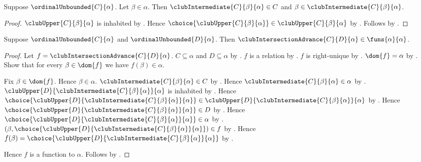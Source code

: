 \begin{proposition}\label{club_intermediate_properties}
    Suppose $\ordinalUnbounded{C}{\alpha}$.
    Let $\beta\in\alpha$.
    Then $\clubIntermediate{C}{\beta}{\alpha}\in C$ and
        $\beta\in\clubIntermediate{C}{\beta}{\alpha}$.
\end{proposition}
\begin{proof}
    $\clubUpper{C}{\beta}{\alpha}$ is inhabited
        by .
    Hence $\choice{\clubUpper{C}{\beta}{\alpha}}
        \in\clubUpper{C}{\beta}{\alpha}$ by .
    Follows by .
\end{proof}

\begin{theorem}\label{club_intersection_advance_type}
    Suppose $\ordinalUnbounded{C}{\alpha}$ and
        $\ordinalUnbounded{D}{\alpha}$.
    Then $\clubIntersectionAdvance{C}{D}{\alpha}
        \in\funs{\alpha}{\alpha}$.
\end{theorem}
\begin{proof}
    Let $f=\clubIntersectionAdvance{C}{D}{\alpha}$.
    $C\subseteq\alpha$ and $D\subseteq\alpha$
        by .
    $f$ is a relation by .
    $f$ is right-unique
        by .
    $\dom{f}=\alpha$
        by .
    Show that for every $\beta\in\dom{f}$ we have $f(\beta)\in\alpha$.
    \begin{subproof}
        Fix $\beta\in\dom{f}$.
        Hence $\beta\in\alpha$.
        $\clubIntermediate{C}{\beta}{\alpha}\in C$
            by .
        Hence $\clubIntermediate{C}{\beta}{\alpha}\in\alpha$
            by .
        $\clubUpper{D}{\clubIntermediate{C}{\beta}{\alpha}}{\alpha}$
            is inhabited by .
        Hence $\choice{\clubUpper{D}{
            \clubIntermediate{C}{\beta}{\alpha}}{\alpha}}
            \in\clubUpper{D}{
                \clubIntermediate{C}{\beta}{\alpha}}{\alpha}$
            by .
        Hence $\choice{\clubUpper{D}{
            \clubIntermediate{C}{\beta}{\alpha}}{\alpha}}\in D$
            by .
        Hence $\choice{\clubUpper{D}{
            \clubIntermediate{C}{\beta}{\alpha}}{\alpha}}\in\alpha$
            by .
        $(\beta,\choice{\clubUpper{D}{
            \clubIntermediate{C}{\beta}{\alpha}}{\alpha}})\in f$
            by .
        Hence $f(\beta)=\choice{\clubUpper{D}{
            \clubIntermediate{C}{\beta}{\alpha}}{\alpha}}$
            by .
    \end{subproof}
    Hence $f$ is a function to $\alpha$.
    Follows by .
\end{proof}

